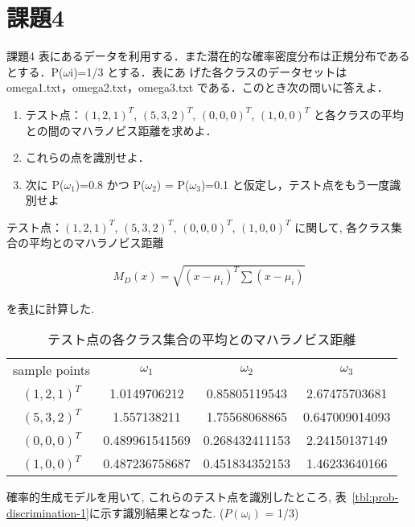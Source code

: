 \section{課題4}
\begin{itembox}{課題4}
  表にあるデータを利用する．また潜在的な確率密度分布は正規分布であるとする．P($\omega$i)=1/3 とする．表にあ
  げた各クラスのデータセットは omega1.txt，omega2.txt，omega3.txt である．このとき次の問いに答えよ．

  \begin{enumerate}
    \item テスト点：$(1, 2, 1)^T$, $(5, 3, 2)^T$, $(0, 0, 0)^T$, $(1, 0, 0)^T$ と各クラスの平均との間のマハラノビス距離を求めよ．
    \item これらの点を識別せよ．
    \item 次に P($\omega_1$)=0.8 かつ P($\omega_2$) = P($\omega_3$)=0.1 と仮定し，テスト点をもう一度識別せよ
  \end{enumerate}
\end{itembox}
テスト点：$(1, 2, 1)^T$, $(5, 3, 2)^T$, $(0, 0, 0)^T$, $(1, 0, 0)^T$
に関して, 各クラス集合の平均とのマハラノビス距離

\begin{eqnarray}
  M_{D}(x) = \sqrt{(x - \mu_{i})^T \sum (x - \mu_i)}
\end{eqnarray}

を表\ref{tbl:mahalanobis}に計算した. 

\begin{table}[htbp]
  \begin{center}
    \begin{tabular}{cccc}
      sample points & $\omega_1$ & $\omega_2$ & $\omega_3$ \\
      $(1, 2, 1)^T$ & 1.0149706212 & 0.85805119543 & 2.67475703681  \\
      $(5, 3, 2)^T$ & 1.557138211 & 1.75568068865 & 0.647009014093 \\
      $(0, 0, 0)^T$ & 0.489961541569 & 0.268432411153 & 2.24150137149  \\
      $(1, 0, 0)^T$ & 0.487236758687 & 0.451834352153 & 1.46233640166  \\
    \end{tabular}
    \caption{テスト点の各クラス集合の平均とのマハラノビス距離}
    \label{tbl:mahalanobis}
  \end{center}
\end{table}

確率的生成モデルを用いて, これらのテスト点を識別したところ, 
表~\ref{tbl:prob-discrimination-1}に示す識別結果となった.
($P(\omega_i)$ = 1/3)

